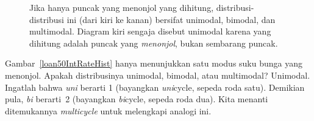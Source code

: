\begin{figure}[h]
  \centering
  \caption{Jika hanya puncak yang menonjol yang dihitung,
      distribusi-distribusi ini (dari kiri ke kanan) bersifat
      unimodal, bimodal, dan multimodal.
      Diagram kiri sengaja disebut unimodal karena yang dihitung
      adalah puncak yang \emph{menonjol}, bukan sembarang puncak.}
  \label{singleBiMultiModalPlots}
\end{figure}

\begin{examplewrap}
\begin{nexample}{Gambar~\ref{loan50IntRateHist}
    hanya menunjukkan satu modus suku bunga yang menonjol.
    Apakah distribusinya unimodal, bimodal, atau multimodal?}
  Unimodal.
  Ingatlah bahwa \emph{uni} berarti 1 (bayangkan \emph{uni}cycle,
  sepeda roda satu). Demikian pula, \emph{bi} berarti~2
  (bayangkan \emph{bi}cycle, sepeda roda dua).
  Kita menanti ditemukannya \emph{multicycle} untuk melengkapi
  analogi ini.
\end{nexample}
\end{examplewrap}

%

